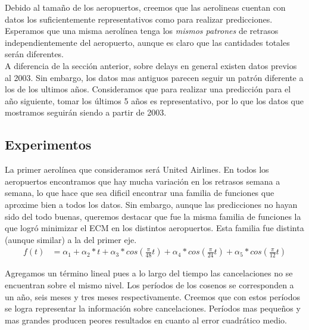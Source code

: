 Debido al tamaño de los aeropuertos, creemos que las aerolineas cuentan con datos los suficientemente representativos como para realizar predicciones. Esperamos que una misma aerolínea tenga los \textit{mismos patrones} de retrasos independientemente del aeropuerto, aunque es claro que las cantidades totales serán diferentes. \\

A diferencia de la sección anterior, sobre delays en general existen datos previos al 2003. Sin embargo, los datos mas antiguos parecen seguir un patrón diferente a los de los ultimos años. Consideramos que para realizar una predicción para el año siguiente, tomar los últimos 5 años es representativo, por lo que los datos que mostramos seguirán siendo a partir de 2003. \\


\subsection{Experimentos}

La primer aerolínea que consideramos será United Airlines. En todos los aeropuertos encontramos que hay mucha variación en los retrasos semana a semana, lo que hace que sea dificil encontrar una familia de funciones que aproxime bien a todos los datos. Sin embargo, aunque las predicciones no hayan sido del todo buenas, queremos destacar que fue la misma familia de funciones la que logró minimizar el ECM en los distintos aeropuertos. Esta familia fue distinta (aunque similar) a la del primer eje.\\

\begin{align}
f(t) &= \alpha_1 + \alpha_2 * t + \alpha_3 * cos(\frac{\pi}{48} t) + \alpha_4 * cos(\frac{\pi}{24} t) + \alpha_5 * cos(\frac{\pi}{12} t)
\end{align}

Agregamos un término lineal pues a lo largo del tiempo las cancelaciones no se encuentran sobre el mismo nivel. Los períodos de los cosenos se corresponden a un año, seis meses y tres meses respectivamente. Creemos que con estos períodos se logra representar la información sobre cancelaciones. Períodos mas pequeños y mas grandes producen peores resultados en cuanto al error cuadrático medio. \\

